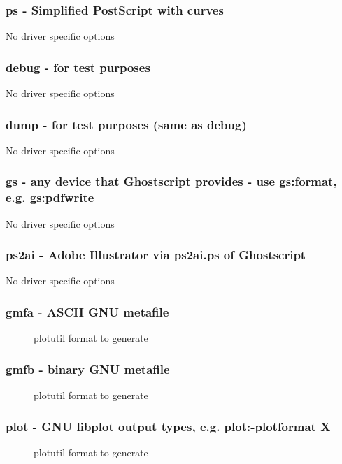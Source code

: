 \documentclass[english,a4paper]{article}
\begin{document}
\subsubsection{ps - Simplified PostScript with curves}
No driver specific options
\subsubsection{debug - for test purposes}
No driver specific options
\subsubsection{dump - for test purposes (same as debug)}
No driver specific options
\subsubsection{gs - any device that Ghostscript provides - use gs:format, e.g. gs:pdfwrite}
No driver specific options
\subsubsection{ps2ai - Adobe Illustrator via ps2ai.ps of Ghostscript}
No driver specific options
\subsubsection{gmfa - ASCII GNU metafile }
\begin{description}
\item[]
plotutil format to generate


\end{description}
\subsubsection{gmfb - binary GNU metafile }
\begin{description}
\item[]
plotutil format to generate


\end{description}
\subsubsection{plot - GNU libplot output types, e.g. plot:-plotformat X}
\begin{description}
\item[]
plotutil format to generate


\end{description}
\end{document}
